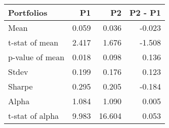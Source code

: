 \begin{tabular}{lrrr}
\toprule
Portfolios & P1 & P2 & P2 - P1 \\
\midrule
Mean & 0.059 & 0.036 & -0.023 \\
t-stat of mean & 2.417 & 1.676 & -1.508 \\
p-value of mean & 0.018 & 0.098 & 0.136 \\
Stdev & 0.199 & 0.176 & 0.123 \\
Sharpe & 0.295 & 0.205 & -0.184 \\
Alpha & 1.084 & 1.090 & 0.005 \\
t-stat of alpha & 9.983 & 16.604 & 0.053 \\
\bottomrule
\end{tabular}
